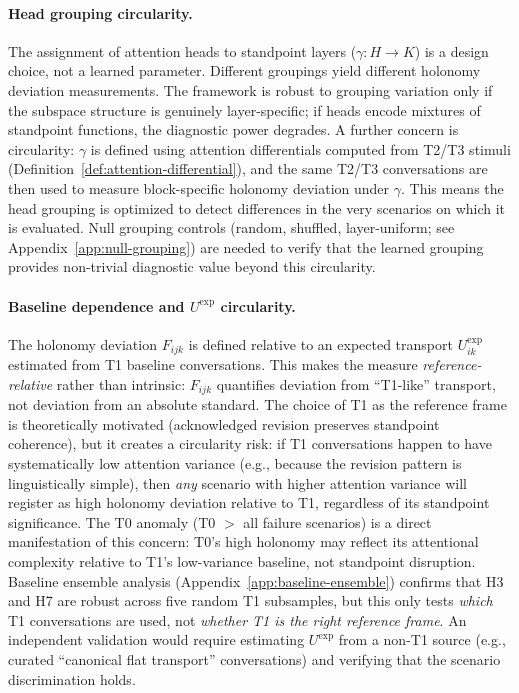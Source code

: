 \paragraph{Head grouping circularity.}
The assignment of attention heads to standpoint layers ($\gamma : H \to K$) is a design
choice, not a learned parameter. Different groupings yield different holonomy deviation
measurements. The framework is robust to grouping variation only if the subspace
structure is genuinely layer-specific; if heads encode mixtures of standpoint functions,
the diagnostic power degrades. A further concern is circularity: $\gamma$ is defined
using attention differentials computed from T2/T3 stimuli
(Definition~\ref{def:attention-differential}), and the same T2/T3 conversations are then
used to measure block-specific holonomy deviation under $\gamma$. This means the head
grouping is optimized to detect differences in the very scenarios on which it is
evaluated. Null grouping controls (random, shuffled, layer-uniform; see
Appendix~\ref{app:null-grouping}) are needed to verify that the learned grouping
provides non-trivial diagnostic value beyond this circularity.

\paragraph{Baseline dependence and $U^{\exp}$ circularity.}
The holonomy deviation $F_{ijk}$ is defined relative to an expected transport
$U_{ik}^{\exp}$ estimated from T1 baseline conversations. This makes the measure
\emph{reference-relative} rather than intrinsic: $F_{ijk}$ quantifies deviation from
``T1-like'' transport, not deviation from an absolute standard. The choice of T1 as the
reference frame is theoretically motivated (acknowledged revision preserves standpoint
coherence), but it creates a circularity risk: if T1 conversations happen to have
systematically low attention variance (e.g., because the revision pattern is
linguistically simple), then \emph{any} scenario with higher attention variance will
register as high holonomy deviation relative to T1, regardless of its standpoint
significance. The T0 anomaly (T0 $>$ all failure scenarios) is a direct manifestation of
this concern: T0's high holonomy may reflect its attentional complexity relative to T1's
low-variance baseline, not standpoint disruption. Baseline ensemble analysis
(Appendix~\ref{app:baseline-ensemble}) confirms that H3 and H7 are robust across five
random T1 subsamples, but this only tests \emph{which} T1 conversations are used, not
\emph{whether T1 is the right reference frame}. An independent validation would require
estimating $U^{\exp}$ from a non-T1 source (e.g., curated ``canonical flat transport''
conversations) and verifying that the scenario discrimination holds.

